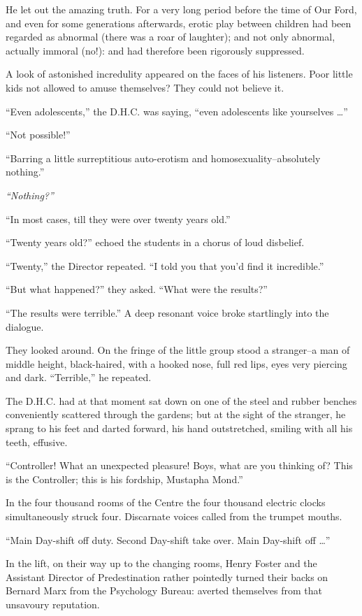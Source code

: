 \documentclass[12pt]{report}
\begin{document}
He let out the amazing truth. For a very long period before the time of
Our Ford, and even for some generations afterwards, erotic play between
children had been regarded as abnormal (there was a roar of laughter);
and not only abnormal, actually immoral (no!): and had therefore been
rigorously suppressed.

A look of astonished incredulity appeared on the faces of his listeners.
Poor little kids not allowed to amuse themselves? They could not believe
it.

``Even adolescents,'' the D.H.C. was saying, ``even adolescents like
yourselves \ldots{}''

``Not possible!''

``Barring a little surreptitious auto-erotism and
homosexuality--absolutely nothing.''

\emph{``Nothing?''}

``In most cases, till they were over twenty years old.''

``Twenty years old?'' echoed the students in a chorus of loud disbelief.

``Twenty,'' the Director repeated. ``I told you that you'd find it
incredible.''

``But what happened?'' they asked. ``What were the results?''

``The results were terrible.'' A deep resonant voice broke startlingly
into the dialogue.

They looked around. On the fringe of the little group stood a
stranger--a man of middle height, black-haired, with a hooked nose, full
red lips, eyes very piercing and dark. ``Terrible,'' he repeated.

The D.H.C. had at that moment sat down on one of the steel and rubber
benches conveniently scattered through the gardens; but at the sight of
the stranger, he sprang to his feet and darted forward, his hand
outstretched, smiling with all his teeth, effusive.

``Controller! What an unexpected pleasure! Boys, what are you thinking
of? This is the Controller; this is his fordship, Mustapha Mond.''

In the four thousand rooms of the Centre the four thousand electric
clocks simultaneously struck four. Discarnate voices called from the
trumpet mouths.

``Main Day-shift off duty. Second Day-shift take over. Main Day-shift
off \ldots{}''

In the lift, on their way up to the changing rooms, Henry Foster and the
Assistant Director of Predestination rather pointedly turned their backs
on Bernard Marx from the Psychology Bureau: averted themselves from that
unsavoury reputation.
\end{document}
